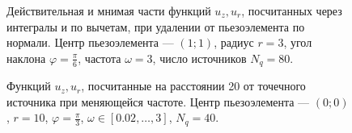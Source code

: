 \documentclass[a4paper, 12pt]{article}
\begin{document}
\begin{figure}[h]
    \begin{minipage}[h]{0.49\linewidth}
    \end{minipage}
    \hfill
    \begin{minipage}[h]{0.49\linewidth}
    \end{minipage}
    \caption{Действительная и мнимая части функций $u_z, u_r$, посчитанных через интегралы и по вычетам, при удалении от пьезоэлемента по нормали. Центр пьезоэлемента --- $(1; 1)$, радиус $r=3$, угол наклона $\varphi= \frac{\pi}{6}$, частота $\omega =3$, число источников $N_q=80$.}
    \label{resl}
    \end{figure}

    \begin{figure}[h]
        \caption{Функций $u_z, u_r$, посчитанные на расстоянии 20 от точечного источника при меняющейся частоте. Центр пьезоэлемента --- $(0; 0)$, $r=10$, $\varphi= \frac{\pi}{3}$, $\omega \in [0.02, \dots,3]$, $N_q=40$.}
        \label{resw}
    \end{figure}
\end{document}
